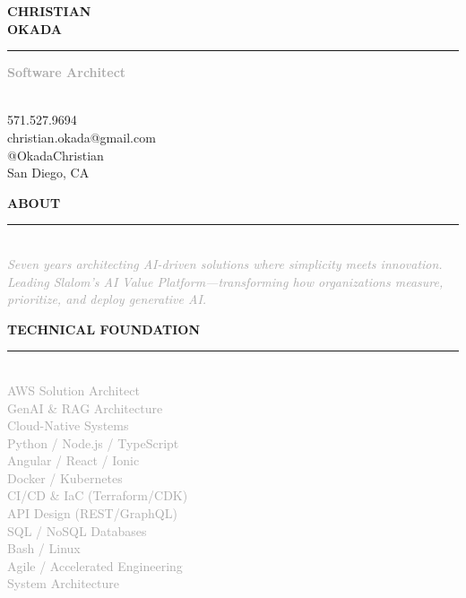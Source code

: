 \documentclass[10pt,letterpaper]{article}
\newcommand{\sidebarheader}[1]{%
    \vspace{6pt}
    {\headingfont\small\textcolor{accent}{\MakeUppercase{\textbf{#1}}}}
    \vspace{1pt}
    \par\noindent\textcolor{accent}{\rule{\linewidth}{1.5pt}}
    \vspace{2pt}
}
\begin{document}
\setlength{\voffset}{-.085in}
\noindent\colorbox{sidebarBg}{%
\begin{minipage}[t][10.885in][t]{2.7in}
\vspace{0.3in}
\hspace{0.3in}
\begin{minipage}{2.1in}
\raggedright

{\displayfont\fontsize{24}{28}\selectfont\textcolor{primary}{\textbf{CHRISTIAN}}}\\[-2pt]
{\displayfont\fontsize{24}{28}\selectfont\textcolor{accent}{\textbf{OKADA}}}

\vspace{4pt}
\noindent\textcolor{accent}{\rule{1.8in}{2.5pt}}
\vspace{6pt}

{\headingfont\small\textcolor{darkgray}{\textbf{Software Architect}}}

\vspace{6pt}

{\footnotesize\textcolor{mediumgray}{\\[-6pt]
571.527.9694\\[3pt]
christian.okada@gmail.com\\[3pt]
@OkadaChristian\\[3pt]
San Diego, CA\\[3pt]
}}

\sidebarheader{About}
{\footnotesize\textcolor{darkgray}{\\[-6pt]\itshape Seven years architecting AI-driven solutions where simplicity meets innovation. Leading Slalom's AI Value Platform—transforming how organizations measure, prioritize, and deploy generative AI.}}

\sidebarheader{Technical Foundation}
{\scriptsize\textcolor{darkgray}{\\[-6pt]
AWS Solution Architect\\[3pt]
GenAI \& RAG Architecture\\[3pt]
Cloud-Native Systems\\[3pt]
Python / Node.js / TypeScript\\[3pt]
Angular / React / Ionic\\[3pt]
Docker / Kubernetes\\[3pt]
CI/CD \& IaC (Terraform/CDK)\\[3pt]
API Design (REST/GraphQL)\\[3pt]
SQL / NoSQL Databases\\[3pt]
Bash / Linux\\[3pt]
Agile / Accelerated Engineering\\[3pt]
System Architecture\\[3pt]
}}


\end{minipage}
\end{minipage}}
\end{document}
